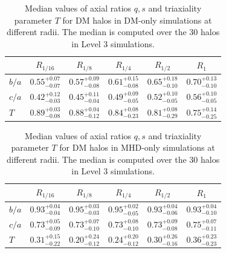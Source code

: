 \documentclass[a4paper,fleqn,usenatbib]{mnras}
\begin{document}
\begin{table}
\setlength{\tabcolsep}{3pt}
\begin{center}
\begin{tabular}{l|ccccc}
 &$R_{1/16}$& $R_{1/8}$& $R_{1/4}$& $R_{1/2}$& $R_1$\\
\hline 
$b/a$ &$0.55^{+0.07}_{-0.07}$&$0.57^{+0.09}_{-0.08}$&$0.61^{+0.15}_{-0.08}$&$0.65^{+0.18}_{-0.10}$&$0.70^{+0.13}_{-0.10}$ \\ [0.1cm]
$c/a$ &$0.42^{+0.12}_{-0.03}$&$0.45^{+0.11}_{-0.04}$&$0.49^{+0.09}_{-0.05}$&$0.52^{+0.10}_{-0.05}$&$0.56^{+0.10}_{-0.05}$\\ [0.1cm]
$T$ &$0.89^{+0.03}_{-0.08}$&$0.88^{+0.04}_{-0.12}$&$0.84^{+0.08}_{-0.23}$&$0.81^{+0.08}_{-0.29}$&$0.75^{+0.14}_{-0.25}$\\ [0.1cm]
\end{tabular}
\end{center}
\caption{Median values of axial ratios $q,s$ and triaxiality parameter
  $T$ for DM halos in DM-only simulations at different radii. The
  median is computed over the 30 halos in Level 3 simulations.}  
\label{table:median_axial_ratio_DM}
\end{table}



\begin{table}
\setlength{\tabcolsep}{3pt}
\begin{center}
\begin{tabular}{l|ccccc}
 &$R_{1/16}$& $R_{1/8}$& $R_{1/4}$& $R_{1/2}$& $R_1$\\
\hline 
$b/a$ &$0.93^{+0.04}_{-0.04}$&$0.95^{+0.03}_{-0.03}$&$0.95^{+0.02}_{-0.05}$&$0.93^{+0.04}_{-0.06}$&$0.93^{+0.04}_{-0.10}$\\[0.1cm]
$c/a$ &$0.73^{+0.05}_{-0.09}$&$0.73^{+0.07}_{-0.10}$&$0.73^{+0.08}_{-0.10}$&$0.73^{+0.09}_{-0.08}$&$0.75^{+0.07}_{-0.11}$\\[0.1cm] 
$T$ &$0.31^{+0.15}_{-0.22}$&$0.20^{+0.24}_{-0.12}$&$0.24^{+0.20}_{-0.12}$&$0.30^{+0.26}_{-0.16}$&$0.36^{+0.23}_{-0.23}$\\[0.1cm] 
\end{tabular}
\end{center}
\caption{Median values of axial ratios $q,s$ and triaxiality parameter
  $T$ for DM halos in MHD-only simulations at different radii. The
  median is computed over the 30 halos in Level 3 simulations.}  
\label{table:median_axial_ratio_MHD}
\end{table}
\end{document}
